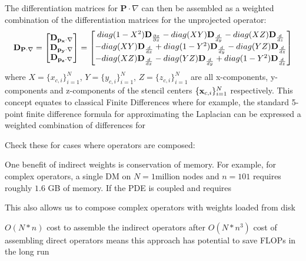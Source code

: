 The differentiation matrices for $\mathbf{P} \cdot \nabla$ can then be assembled as a weighted combination of the differentiation matrices for the unprojected operator: 
\begin{equation}
\mathbf{D}_{\mathbf{P} \cdot \nabla} = \begin{bmatrix} \mathbf{D}_{\mathbf{p_{x} \cdot \nabla}} \\  \mathbf{D}_{\mathbf{p_{y}\cdot \nabla}} \\  \mathbf{D}_{\mathbf{p_{z}\cdot \nabla}} \end{bmatrix} = \begin{bmatrix} 
diag(1-X^{2}) \mathbf{D}_{\frac{\partial x}{\partial x}} - diag(XY) \mathbf{D}_{\frac{d }{d y}} - diag(XZ) \mathbf{D}_{\frac{d }{d z}} \\
- diag(XY)\mathbf{D}_{\frac{d }{d x}} + diag(1-Y^{2}) \mathbf{D}_{\frac{d }{d y}} - diag(YZ) \mathbf{D}_{\frac{d }{d z}} \\
- diag(XZ)\mathbf{D}_{\frac{d }{d x}} - diag(YZ) \mathbf{D}_{\frac{d }{d y}} + diag(1-Y^{2}) \mathbf{D}_{\frac{d }{d z}} 
\end{bmatrix}
\end{equation}
 where $X = \{x_{c,i}\}_{i=1}^{N}$, $Y = \{y_{c,i}\}_{i=1}^{N}$, $Z = \{z_{c,i}\}_{i=1}^{N}$ are all x-components, y-components and z-components of the stencil centers $\{\mathbf{x}_{c,i}\}_{i=1}^{N}$ respectively. 
This concept equates to classical Finite Differences where for example, the standard 5-point finite difference formula for approximating the Laplacian can be expressed a weighted combination of differences for 

Check these for cases where operators are composed: 
\cite{FlyerLehto11}
\cite{WrightFlyerYuen10}
\cite{FornbergLehto11}

One benefit of indirect weights is conservation of memory. For example, for complex operators, a single DM on $N=1 \text{million}$ nodes and $n=101$ requires roughly $1.6$ GB of memory. If the PDE is coupled and requires 

This also allows us to compose complex operators with weights loaded from disk

$O(N*n)$ cost to assemble the indirect operators after $O(N*n^{3})$ cost of assembling direct operators means this approach has potential to save FLOPs in the long run

